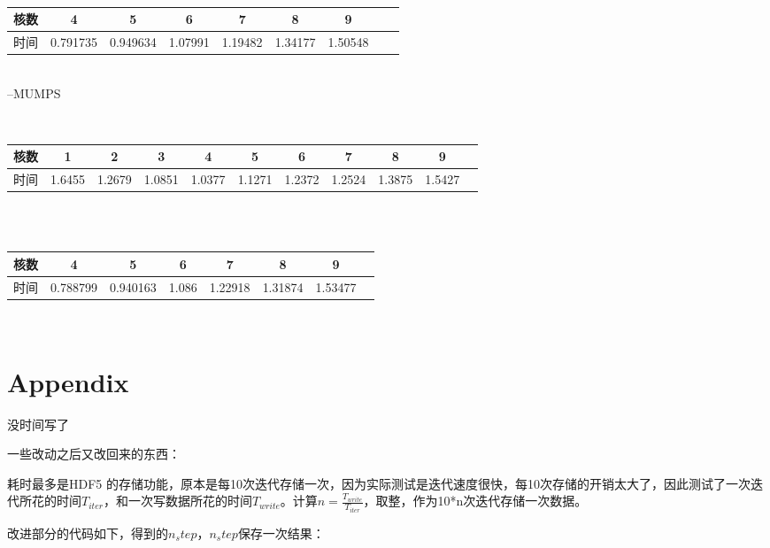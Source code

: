 \documentclass[10pt, a4paper]{article}
\begin{document}
~\\

\begin{tabular}{|c|c|c|c|c|c|c|c|c|}%
\hline  %
核数&4&5&6&7&8&9\\
\hline  %
时间&0.791735&0.949634&1.07991&1.19482&1.34177&1.50548\\
\hline %
\end{tabular}

~\\



--MUMPS

~\\

\begin{tabular}{|c|c|c|c|c|c|c|c|c|c|c|}%
\hline  %
核数&1&2&3&4&5&6&7&8&9\\
\hline  %
时间&1.6455&1.2679&1.0851&1.0377&1.1271&1.2372&1.2524&1.3875&1.5427\\
\hline %
\end{tabular}

~\\

~\\

\begin{tabular}{|c|c|c|c|c|c|c|c|}%
\hline  %
核数&4&5&6&7&8&9\\
\hline  %
时间&0.788799&0.940163&1.086&1.22918&1.31874&1.53477\\
\hline %
\end{tabular}

~\\


\clearpage
\section*{Appendix}

没时间写了

一些改动之后又改回来的东西：

耗时最多是HDF5 的存储功能，原本是每10次迭代存储一次，因为实际测试是迭代速度很快，每10次存储的开销太大了，因此测试了一次迭代所花的时间$T_{iter}$，和一次写数据所花的时间$T_{write}$。计算$n=\frac{T_{write}}{T_{iter}}$，取整，作为10*n次迭代存储一次数据。

改进部分的代码如下，得到的$n_step，n_step$保存一次结果：
\end{document}
